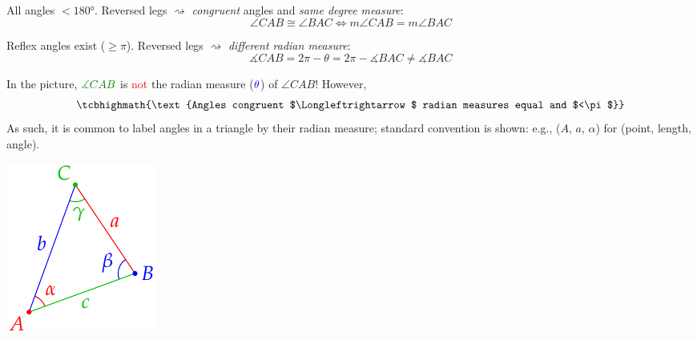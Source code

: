 \begin{description}\itemsep0pt
  \item[Euclidean geometry] All angles $<\ang{180}$. Reversed legs $\rightsquigarrow$ \emph{congruent} angles and \emph{same degree measure}:
  \[
  	\angle CAB\cong\angle BAC\iff m\angle CAB=m\angle BAC
  \]
  \item[Analytic geometry] Reflex angles exist ($\ge\pi$). Reversed legs $\rightsquigarrow$ \emph{different radian measure}:
  \[
  	\measuredangle CAB=2\pi-\theta=2\pi-\measuredangle BAC \neq \measuredangle BAC \tag{unless a straight edge}
  \]
	\begin{minipage}[t]{0.79\linewidth}\vspace{-5pt}
  	In the picture, $\textcolor{Green}{\measuredangle CAB}$ is \textcolor{red}{not} the radian measure ($	\textcolor{blue}{\theta}$) of $\angle CAB$! However,
  	\[
			\tcbhighmath{\text{Angles congruent $\Longleftrightarrow$ radian measures equal and $<\pi$}}
		\]
		As such, it is common to label angles in a triangle by their radian measure; standard convention is shown: e.g., ($A$, $a$, $\alpha$) for (point, length, angle).%
	\end{minipage}
	\hfill
	\begin{minipage}[t]{0.2\linewidth}\vspace{-17pt}
		\flushright\includegraphics{angle-notation}
	\end{minipage}
\end{description}





